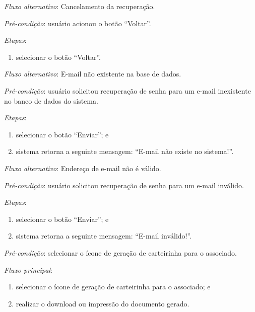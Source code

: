 \noindent \textit{Fluxo alternativo}: Cancelamento da recuperação.

\noindent \textit{Pré-condição}: usuário acionou o botão ``Voltar''.

\noindent \textit{Etapas}:

\begin{enumerate}
    \item selecionar o botão ``Voltar''.
\end{enumerate}


\noindent \textit{Fluxo alternativo}: E-mail não existente na base de dados.

\noindent \textit{Pré-condição}: usuário solicitou recuperação de senha para um e-mail inexistente no banco de dados do sistema.

\noindent \textit{Etapas}:

\begin{enumerate}
    \item selecionar o botão ``Enviar''; e
    \item sistema retorna a seguinte mensagem: ``E-mail não existe no sistema!''.
\end{enumerate}


\noindent \textit{Fluxo alternativo}: Endereço de e-mail não é válido.

\noindent \textit{Pré-condição}: usuário solicitou recuperação de senha para um e-mail inválido.

\noindent \textit{Etapas}:

\begin{enumerate}
    \item selecionar o botão ``Enviar''; e
    \item sistema retorna a seguinte mensagem: ``E-mail inválido!''.
\end{enumerate}



\vspace{0.7cm}

\noindent \textit{Pré-condição}: selecionar o ícone de geração de carteirinha para o associado.

\noindent \textit{Fluxo principal}:

\begin{enumerate}
    \item selecionar o ícone de geração de carteirinha para o associado; e
    \item realizar o download ou impressão do documento gerado.
\end{enumerate}

